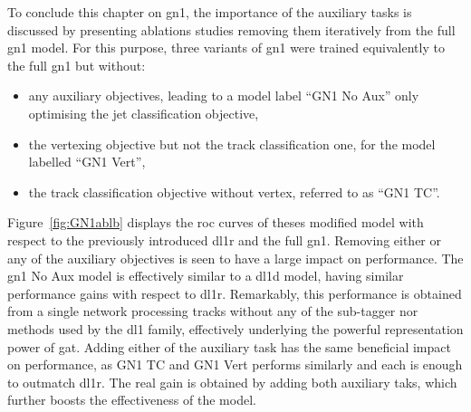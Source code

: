 To conclude this chapter on \gls{gn1}, the importance of the auxiliary tasks is discussed by presenting ablations studies removing them iteratively from the full \gls{gn1} model. For this purpose, three variants of \gls{gn1} were trained equivalently to the full \gls{gn1} but without:
\begin{itemize}
  \item any auxiliary objectives, leading to a model label ``GN1 No Aux'' only optimising the jet classification objective,
  \item the vertexing objective but not the track classification one, for the model labelled ``GN1 Vert'',
  \item the track classification objective without vertex, referred to as ``GN1 TC''.
\end{itemize}
Figure~\ref{fig:GN1ablb} displays the \gls{roc} curves of theses modified model with respect to the previously introduced \gls{dl1r} and the full \gls{gn1}. Removing either or any of the auxiliary objectives is seen to have a large impact on performance. The \gls{gn1} No Aux model is effectively similar to a \gls{dl1d} model, having similar performance gains with respect to \gls{dl1r}. Remarkably, this performance is obtained from a single network processing tracks without any of the sub-tagger nor methods used by the \gls{dl1} family, effectively underlying the powerful representation power of \gls{gat}. Adding either of the auxiliary task has the same beneficial impact on performance, as GN1 TC and GN1 Vert performs similarly and each is enough to outmatch \gls{dl1r}. The real gain is obtained by adding both auxiliary taks, which further boosts the effectiveness of the model. 

